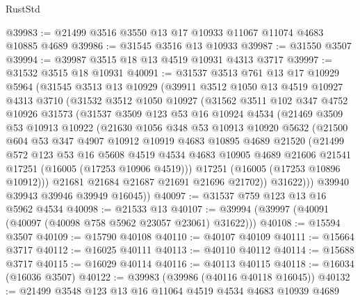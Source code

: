 \begin{lexlean}{RustStd}
\begin{coremodule}
@39983 := @21499 @3516 @3550 @13 @17 @10933 @11067 @11074 @4683 @10885 @4689
@39986 := @31545 @3516 @13 @10933
@39987 := @31550 @3507
@39994 := @39987 @3515 @18 @13 @4519 @10931 @4313 @3717
@39997 := @31532 @3515 @18 @10931
@40091 := @31537
    @3513
    @761
    @13
    @17
    @10929
    @5964
    (@31545
      @3513
      @13
      @10929
      (@39911
        @3512
        @1050
        @13
        @4519
        @10927
        @4313
        @3710
        (@31532
          @3512
          @1050
          @10927
          (@31562
            @3511
            @102
            @347
            @4752
            @10926
            @31573
            (@31537
              @3509
              @123
              @53
              @16
              @10924
              @4534
              (@21469
                @3509
                @53
                @10913
                @10922
                (@21630
                  @1056
                  @348
                  @53
                  @10913
                  @10920
                  @5632
                  (@21500
                    @604
                    @53
                    @347
                    @4907
                    @10912
                    @10919
                    @4683
                    @10895
                    @4689
                    @21520
                    (@21499
                      @572
                      @123
                      @53
                      @16
                      @5608
                      @4519
                      @4534
                      @4683
                      @10905
                      @4689
                      @21606
                      @21541
                      @17251
                      (@16005 (@17253 @10906 @4519)))
                    @17251
                    (@16005 (@17253 @10896 @10912)))
                  @21681
                  @21684
                  @21687
                  @21691
                  @21696
                  @21702))
              @31622)))
        @39940
        @39943
        @39946
        @39949
        @16045))
@40097 := @31537 @759 @123 @13 @16 @5962 @4534
@40098 := @21533 @13
@40107 := @39994 (@39997 (@40091 (@40097 (@40098 @758 @5962 @23057 @23061) @31622)))
@40108 := @15594 @3507
@40109 := @15790 @40108
@40110 := @40107 @40109
@40111 := @15664 @3717
@40112 := @16025 @40111
@40113 := @40110 @40112
@40114 := @15688 @3717
@40115 := @16029 @40114
@40116 := @40113 @40115
@40118 := @16034 (@16036 @3507)
@40122 := @39983 (@39986 (@40116 @40118 @16045))
@40132 := @21499 @3548 @123 @13 @16 @11064 @4519 @4534 @4683 @10939 @4689

\end{coremodule}
\end{lexlean}
